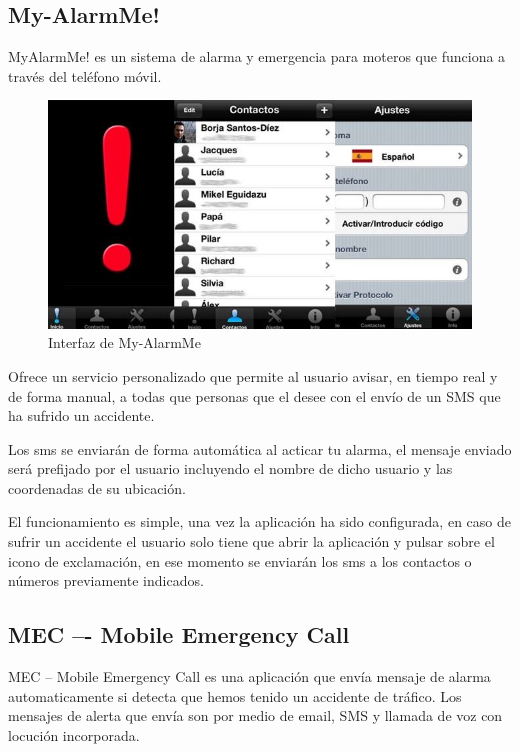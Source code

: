 		\subsection{My-AlarmMe!}
		
			MyAlarmMe! \cite{MyAlamMe} es un sistema de alarma y emergencia para moteros que funciona a través del teléfono móvil.
			
			\begin{figure}[h]
				\centering
				\includegraphics{imagenes/alarm.JPG}
				\caption{Interfaz de My-AlarmMe}
				\label{contexto:figura}
			\end{figure}
			
			Ofrece un servicio personalizado que permite al usuario avisar, en tiempo real y de forma manual, a todas que personas que el desee con el envío de un SMS que ha sufrido un accidente.
			
			Los sms se enviarán de forma automática al acticar tu alarma, el mensaje enviado será prefijado por el usuario incluyendo el nombre de dicho usuario y las coordenadas de su ubicación.
			
			El funcionamiento es simple, una vez la aplicación ha sido configurada, en caso de sufrir un accidente el usuario solo tiene que abrir la aplicación y pulsar sobre el icono de exclamación, en ese momento se enviarán los sms a los contactos o números previamente indicados.
			
			
		
		\subsection{MEC –- Mobile Emergency Call}
		
			MEC -- Mobile Emergency Call \cite{MEC} es una aplicación que envía mensaje de alarma automaticamente si detecta que hemos tenido un accidente de tráfico. Los mensajes de alerta que envía son por medio de email, SMS y llamada de voz con locución incorporada.
			

